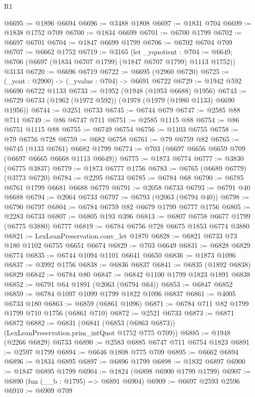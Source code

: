\begin{lexlean}{R1}
\begin{coremodule}
@6695 := @1896 @6694
@6696 := @3488 @1808
@6697 := @1831 @704
@6699 := @1838 @1752 @709
@6700 := @1834 @6699
@6701 := @6700 @1799
@6702 := @6697 @6701
@6704 := @1847 @6699 @1799
@6706 := @6702 @6704 @709
@6707 := @6662 @1752
@6719 := @3165
    (let _yquotient : @704 := @6649;
    @6706 (@6697 (@1834 @6707 @1799) (@1847 @6707 @1799) @1113 @1752))
    @3133
@6720 := @6696 @6719
@6722 := @6695 (@2960 @6720)
@6725 := (_yout : @2900) -> (_yvalue : @704) -> @6691 @6722
@6729 := @1942 @592 @6690 @6722 @1133
@6733 := @1952 (@1948 (@1953 @6688) @1956)
@6743 := @6729 @6733 (@1962 (@1972 @592)) (@1978 (@1979 (@1980 @1133) @6690 @1956))
@6744 := @3251 @6733
@6745 := @6744 @679
@6747 := @2585 @88 @711
@6749 := @86 @6747 @711
@6751 := @2585 @1115 @88
@6754 := @86 @6751 @1115 @88
@6755 := @6749 @6754
@6756 := @1103 @6755
@6758 := @79 @6756 @728
@6759 := @682 @6758
@6761 := @79 @6759 @82
@6765 := @6745 (@133 @6761) @6682 @1799
@6774 := @703 (@6697 @6656 @6659 @709 (@6697 @6665 @6668 @1113 @6649))
@6775 := @1873 @6774
@6777 := @3830 (@6775 @3837)
@6779 := @1873 @6777 @1756
@6783 := @6765 (@6689 @6779) (@3773 @6720)
@6784 := @2295 @6733
@6785 := @6784 @68
@6790 := @6785 @6761 @1799 @6681 @6688 @6779
@6791 := @2058 @6733
@6793 := @6791 @40 @6688
@6794 := @2064 @6733
@6797 := @6793 (@2063 (@6794 @40))
@6798 := @6790 @6797
@6804 := @6784 @6759 @82 @6679 @1799 @6777 @1756
@6805 := @2283 @6733
@6807 := @6805 @193 @396
@6813 := @6807 @6758 @6677 @1799 (@6775 @3880) @6777
@6819 := @6784 @6756 @728 @6675 @1853 @6774 @3880
@6821 := LexLeanPreservation.conv_let @1870
@6828 := @6821 @6733 @73 @180 @1102 @6755 @6651 @6674
@6829 := @703 @6649
@6831 := @6828 @6829 @6774
@6835 := @6744 @1094 @1101 @6641 @6650
@6836 := @1873 @1096
@6837 := @3992 @1756
@6838 := @6836 @6837
@6841 := @6835 (@1892 @6838) @6829
@6842 := @6784 @80
@6847 := @6842 @1100 @1799 @1823 @1891 @6838
@6852 := @6791 @64 @1891 (@2063 (@6794 @64))
@6853 := @6847 @6852
@6859 := @6784 @1097 @1099 @1799 @1822 @1096 @6837
@6861 := @4005 @6733 @180
@6863 := @6859 (@6861 @1096)
@6871 := @6784 @711 @82 @1799 @1799 @710 @1756 (@6861 @710)
@6872 := @2521 @6733
@6873 := @6871 @6872
@6882 := @6831 (@6841 (@6853 (@6863 @6873)) (LexLeanPreservation.prim_intQuot @1752 @775 @709))
@6885 := @1948 (@2266 @6829) @6733
@6890 := @2583 @6885 @6747 @711 @6754 @1823
@6891 := @2597 @1799
@6894 := @6646 @1808 @775 @709
@6895 := @6662 @6894
@6896 := @1834 @6895
@6897 := @6896 @1799
@6898 := @1832 @6897
@6900 := @1847 @6895 @1799
@6904 := @1824 (@6898 @6900 @1799 @1799)
@6907 := @6890 (fun (__b : @1795) => @6891 @6904)
@6909 := @6697 @2593 @2596
@6910 := @6909 @709

\end{coremodule}
\end{lexlean}
